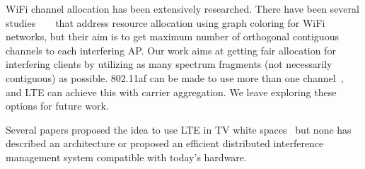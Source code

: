 WiFi channel allocation has been extensively researched. 
There have been several studies ~\cite{client-deriven} ~\cite{load-aware} that address resource allocation using graph coloring for WiFi networks, but their aim is to get maximum number of orthogonal contiguous channels to each interfering AP. Our work aims at getting fair allocation for interfering clients by utilizing as many spectrum fragments (not necessarily contiguous) as possible.
\wf 802.11af can be made to use more than one channel~\cite{whitefi}, and  LTE can achieve this with carrier aggregation. We leave exploring these options for future work. 

Several papers proposed the idea to use LTE in TV white spaces~\cite{dyspan_lte12, radisys} but none has described an architecture or proposed an efficient distributed interference management system compatible with today's hardware. 

